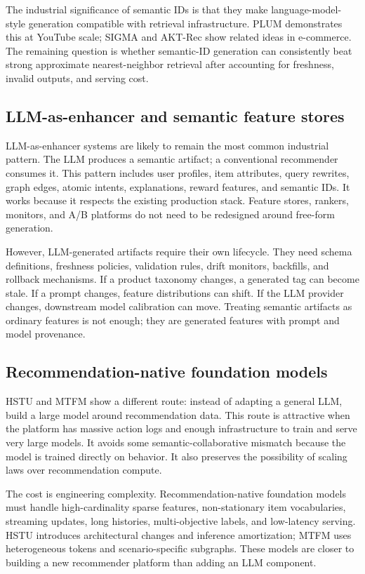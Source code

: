 \documentclass[11pt]{article}
\begin{document}
The industrial significance of semantic IDs is that they make language-model-style generation compatible with retrieval infrastructure. PLUM demonstrates this at YouTube scale; SIGMA and AKT-Rec show related ideas in e-commerce. The remaining question is whether semantic-ID generation can consistently beat strong approximate nearest-neighbor retrieval after accounting for freshness, invalid outputs, and serving cost.

\subsection{LLM-as-enhancer and semantic feature stores}

LLM-as-enhancer systems are likely to remain the most common industrial pattern. The LLM produces a semantic artifact; a conventional recommender consumes it. This pattern includes user profiles, item attributes, query rewrites, graph edges, atomic intents, explanations, reward features, and semantic IDs. It works because it respects the existing production stack. Feature stores, rankers, monitors, and A/B platforms do not need to be redesigned around free-form generation.

However, LLM-generated artifacts require their own lifecycle. They need schema definitions, freshness policies, validation rules, drift monitors, backfills, and rollback mechanisms. If a product taxonomy changes, a generated tag can become stale. If a prompt changes, feature distributions can shift. If the LLM provider changes, downstream model calibration can move. Treating semantic artifacts as ordinary features is not enough; they are generated features with prompt and model provenance.

\subsection{Recommendation-native foundation models}

HSTU and MTFM show a different route: instead of adapting a general LLM, build a large model around recommendation data. This route is attractive when the platform has massive action logs and enough infrastructure to train and serve very large models. It avoids some semantic-collaborative mismatch because the model is trained directly on behavior. It also preserves the possibility of scaling laws over recommendation compute.

The cost is engineering complexity. Recommendation-native foundation models must handle high-cardinality sparse features, non-stationary item vocabularies, streaming updates, long histories, multi-objective labels, and low-latency serving. HSTU introduces architectural changes and inference amortization; MTFM uses heterogeneous tokens and scenario-specific subgraphs. These models are closer to building a new recommender platform than adding an LLM component.
\end{document}
